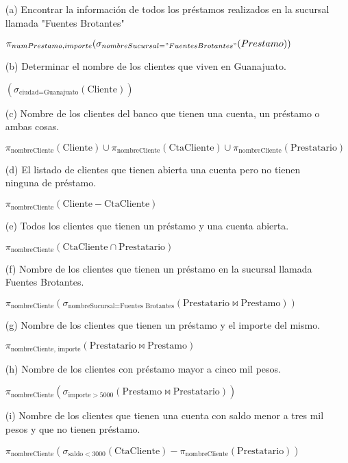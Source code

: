 \documentclass[a4paper,12pt]{article}
\begin{document}
\begin{enumerate}
\begin{itemize}
        \item[(a)] Encontrar la información de todos los préstamos realizados en la sucursal llamada "Fuentes Brotantes"
                
        
        $\pi_{numPrestamo, importe}(\sigma_{nombreSucursal="Fuentes Brotantes"}(Prestamo))$

        
        \item[(b)] Determinar el nombre de los clientes que viven en Guanajuato.

        $(\sigma_{\text{ciudad} = \text{Guanajuato}} ( \text{Cliente} ))$

        
        \item[(c)] Nombre de los clientes del banco que tienen una cuenta, un préstamo o ambas cosas.

        $\pi_{\text{nombreCliente}}(\text{Cliente}) \cup \pi_{\text{nombreCliente}}(\text{CtaCliente}) \cup \pi_{\text{nombreCliente}}(\text{Prestatario})$

        
        \item[(d)] El listado de clientes que tienen abierta una cuenta pero no tienen ninguna de préstamo.

        $\pi_{\text{nombreCliente}}(\text{Cliente} - \text{CtaCliente})$

        
        \item[(e)] Todos los clientes que tienen un préstamo y una cuenta abierta.

        $\pi_{\text{nombreCliente}}(\text{CtaCliente} \cap \text{Prestatario})$

        
        \item[(f)] Nombre de los clientes que tienen un préstamo en la sucursal llamada Fuentes Brotantes.

        $\pi_{\text{nombreCliente}}(\sigma_{\text{nombreSucursal}=\text{Fuentes Brotantes}}(\text{Prestatario} \bowtie \text{Prestamo}))$
        
        \item[(g)] Nombre de los clientes que tienen un préstamo y el importe del mismo.

        $\pi_{\text{nombreCliente, importe}}(\text{Prestatario} \bowtie \text{Prestamo})$

        
        \item[(h)] Nombre de los clientes con préstamo mayor a cinco mil pesos.

        $\pi_{\text{nombreCliente}}(\sigma_{\text{importe}>5000}(\text{Prestamo} \bowtie \text{Prestatario}))$

        
        \item[(i)] Nombre de los clientes que tienen una cuenta con saldo menor a tres mil pesos y que no tienen préstamo.

        $\pi_{\text{nombreCliente}}(\sigma_{\text{saldo}<3000}(\text{CtaCliente}) - \pi_{\text{nombreCliente}}(\text{Prestatario}))$
        
    \end{itemize}
        

\end{enumerate}
\thispagestyle{fancy}    
\end{document}
